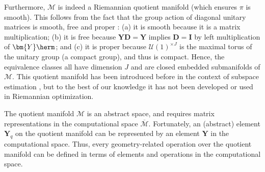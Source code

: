 Furthermore, $\mathcal{M}$ is indeed a Riemannian quotient manifold (which ensures $\pi$ is smooth). This follows from the fact that the group action of diagonal unitary matrices is smooth, free and proper \cite[Section 9.2]{boumal2020intromanifolds}: (a) it is smooth because it is a matrix multiplication; (b) it is free because $\bm{Y}\bm{D}=\bm{Y}$ implies $\bm{D}=\bm{I}$ by left multiplication of $\bm{Y}\herm$; and (c) it is proper because $\mathcal{U}(1)^{\times J}$ is the maximal torus of the unitary group (a compact group), and thus is compact. Hence, the equivalence classes all have dimension $J$ and are closed embedded submanifolds of $\mathcal{M}$. This quotient manifold has been introduced before in the context of subspace estimation \cite{Palka2015}, but to the best of our knowledge it has not been developed or used in Riemannian optimization.

The quotient manifold $\mathcal{M}$ is an abstract space, and requires matrix representations in the computational space $\overline{\mathcal{M}}$. 
Fortunately, an (abstract) element ${\bm{Y}}_q$ on the quotient manifold can be represented by an element $\bm{Y}$ in the computational space.
Thus, every geometry-related operation over the quotient manifold can be defined in terms of elements and operations in the computational space. 

